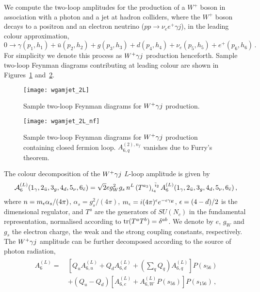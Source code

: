 \documentclass[main.tex]{subfiles}
\begin{document}
We compute the two-loop amplitudes for the production of a $W^+$ boson in association with a photon and a jet at hadron colliders,
where the $W^+$ boson decays to a positron and an electron neutrino ($pp \to \nu_e e^+ \gamma j$),
in the leading colour approximation,
%
\begin{equation} \label{Wyjeq:wpaj}
0 \rightarrow \gamma(p_1,h_1)+\bar{u}(p_2,h_2)+g(p_3,h_3)+d(p_4,h_4)+\nu_e(p_5,h_5)+e^+(p_6,h_6) \,.
\end{equation}
%
For simplicity we denote this process as $W^+\gamma j$ production henceforth. Sample two-loop Feynman diagrams contributing at leading colour are shown in Figures~\ref{Wyjfig:diag2L} and~\ref{Wyjfig:diag2Lnf}.
%
\begin{figure}[t!]
  \begin{center}
    \texttt{[image: wgamjet\_2L]}
  \end{center}
  \caption{Sample two-loop Feynman diagrams for $W^+\gamma j$ production.}
  \label{Wyjfig:diag2L}
\end{figure}
\begin{figure}[t]
  \begin{center}
    \texttt{[image: wgamjet\_2L\_nf]}
  \end{center}
  \caption{Sample two-loop Feynman diagrams for $W^+\gamma j$ production containing closed fermion loop. $A_{6,q}^{(2),n_f}$ vanishes due to Furry's theorem.}
  \label{Wyjfig:diag2Lnf}
\end{figure}
%
The colour decomposition of the $W^+\gamma j$ $L$-loop amplitude is given by
\begin{equation}
\mathcal{A}_{6}^{(L)}(1_\gamma,2_{\bar{u}},3_g,4_d,5_{\nu},6_{\bar{e}}) = \sqrt{2} e g_W^2  g_s \, n^L \, (T^{a_3})_{i_4}^{\;\;\bar i_2} \, A_{6}^{(L)}(1_\gamma,2_{\bar{u}},3_g,4_d,5_{\nu},6_{\bar{e}}) \,,
\label{Wyjeq:colourdecomposition}
\end{equation}
where  $n= m_\epsilon  \alpha_s/(4\pi)$, $\alpha_s = g_s^2/(4\pi)$, $m_\epsilon=i (4\pi)^{\epsilon} e^{-\epsilon\gamma_E}$, $\epsilon = (4-d)/2$ is the dimensional regulator, and
$T^a$ are the generators of $SU(N_c)$ in the fundamental representation, normalised according to $\operatorname{\rm tr}(T^a T^b) = \delta^{ab}$.
We denote by $e$, $g_W$ and $g_s$ the electron charge, the weak and the strong coupling constants, respectively.
The $W^+\gamma j$ amplitude can be further decomposed according to the source of photon radiation,
\begin{align}
\label{Wyjeq:ampdecomposition}
\begin{aligned}
A_{6}^{(L)} = \ & \left[ Q_u A^{(L)}_{6,u} + Q_d A^{(L)}_{6,d} + \left(\sum_{q} Q_q\right) A^{(L)}_{6,q} \right] P(s_{56}) \\
& + \left(Q_u - Q_d\right) \left[ A^{(L)}_{6,e} + A^{(L)}_{6,W} P(s_{56}) \right] P(s_{156}) \,,
\end{aligned}
\end{align}
\end{document}
